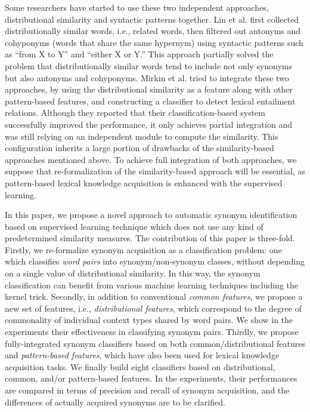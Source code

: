 \documentclass[english]{jnlp_1.4}
\begin{document}
Some researchers have started to use these two independent approaches,
distributional similarity and syntactic patterns together.  Lin et
al. \cite{Lin:03} first collected distributionally similar words,
i.e., related words, then filtered out antonyms and cohyponyms (words
that share the same hypernym) using syntactic patterns such as ``from
X to Y'' and ``either X or Y.'' This approach partially solved the
problem that distributionally similar words tend to include not only
synonyms but also antonyms and cohyponyms.  Mirkin et
al. \cite{Mirkin:06} tried to integrate these two approaches, by using
the distributional similarity as a feature along with other
pattern-based features, and constructing a classifier to detect
lexical entailment relations. Although they reported that their
classification-based system successfully improved the performance, it
only achieves partial integration and was still relying on an
independent module to compute the similarity. This configuration
inherits a large portion of drawbacks of the similarity-based
approaches mentioned above. To achieve full integration of both
approaches, we suppose that re-formalization of the similarity-based
approach will be essential, as pattern-based lexical knowledge
acquisition is enhanced with the supervised learning.


In this paper, we propose a novel approach to automatic synonym
identification based on supervised learning technique which does not
use any kind of predetermined similarity measures. The contribution of
this paper is three-fold. Firstly, we re-formalize synonym acquisition
as a classification problem: one which classifies \textit{word pairs}
into synonym/non-synonym classes, without depending on a single value
of distributional similarity. In this way, the synonym classification
can benefit from various machine learning techniques including the
kernel trick. Secondly, in addition to conventional \textit{common
features}, we propose a new set of features, i.e., \textit{distributional
features}, which correspond to the degree of commonality of individual
context types shared by word pairs. We show in the experiments their
effectiveness in classifying synonym pairs. Thirdly, we propose
fully-integrated synonym classifiers based on both
common/distributional features and \textit{pattern-based features}, which
have also been used for lexical knowledge acquisition tasks. We
finally build eight classifiers based on distributional, common,
and/or pattern-based features. In the experiments, their performances
are compared in terms of precision and recall of synonym acquisition,
and the differences of actually acquired synonyms are to be clarified.
\end{document}
